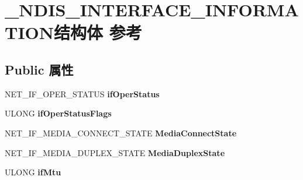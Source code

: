 \hypertarget{struct___n_d_i_s___i_n_t_e_r_f_a_c_e___i_n_f_o_r_m_a_t_i_o_n}{}\section{\+\_\+\+N\+D\+I\+S\+\_\+\+I\+N\+T\+E\+R\+F\+A\+C\+E\+\_\+\+I\+N\+F\+O\+R\+M\+A\+T\+I\+O\+N结构体 参考}
\label{struct___n_d_i_s___i_n_t_e_r_f_a_c_e___i_n_f_o_r_m_a_t_i_o_n}
\subsection*{Public 属性}
\begin{DoxyCompactItemize}
\item 
\mbox{\label{struct___n_d_i_s___i_n_t_e_r_f_a_c_e___i_n_f_o_r_m_a_t_i_o_n_a6b98620fb40481b4ea514c33716a36d7}} 
N\+E\+T\+\_\+\+I\+F\+\_\+\+O\+P\+E\+R\+\_\+\+S\+T\+A\+T\+US {\bfseries if\+Oper\+Status}
\item 
\mbox{\label{struct___n_d_i_s___i_n_t_e_r_f_a_c_e___i_n_f_o_r_m_a_t_i_o_n_ac48f8aa99cfed96755d68befa4d8d484}} 
U\+L\+O\+NG {\bfseries if\+Oper\+Status\+Flags}
\item 
\mbox{\label{struct___n_d_i_s___i_n_t_e_r_f_a_c_e___i_n_f_o_r_m_a_t_i_o_n_a95653fa7d44909e22eb768b060b834cb}} 
N\+E\+T\+\_\+\+I\+F\+\_\+\+M\+E\+D\+I\+A\+\_\+\+C\+O\+N\+N\+E\+C\+T\+\_\+\+S\+T\+A\+TE {\bfseries Media\+Connect\+State}
\item 
\mbox{\label{struct___n_d_i_s___i_n_t_e_r_f_a_c_e___i_n_f_o_r_m_a_t_i_o_n_a33d4a427fa1833cc9763d72b81ae9626}} 
N\+E\+T\+\_\+\+I\+F\+\_\+\+M\+E\+D\+I\+A\+\_\+\+D\+U\+P\+L\+E\+X\+\_\+\+S\+T\+A\+TE {\bfseries Media\+Duplex\+State}
\item 
\mbox{\label{struct___n_d_i_s___i_n_t_e_r_f_a_c_e___i_n_f_o_r_m_a_t_i_o_n_a1ff5ef0f83ab4557ce77a0c082d029e1}} 
U\+L\+O\+NG {\bfseries if\+Mtu}
\item 

\end{DoxyCompactItemize}
